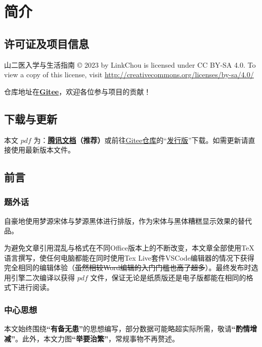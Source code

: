 \chapter[简介]{简介}

\section[许可证及项目信息]{许可证及项目信息}
山二医入学与生活指南 © 2023 by LinkChou is licensed under CC BY-SA 4.0. To view a copy of this license, visit \uline{\href{http://creativecommons.org/licenses/by-sa/4.0/}{http://creativecommons.org/licenses/by-sa/4.0/}}

仓库地址在\textbf{\uline{\href{https://gitee.com/mikazo/guide_for_freshman}{Gitee}}}，欢迎各位参与项目的贡献！

\section[\textcolor{red}{下载与更新}]{下载与更新}
本文 $pdf$ \textbf{}为：\textbf{\uline{\textcolor{red}{\href{https://docs.qq.com/s/ETcQ-ZFSrSsh6MK9bm773q}{腾讯文档}}}（推荐）}或前往\uline{\href{https://gitee.com/mikazo/guide_for_freshman}{Gitee仓库}}的“\uline{\href{https://gitee.com/mikazo/latex_version/releases/latest}{发行版}}”下载。如需更新请直接使用最新版本文件。

\section[前言]{前言}
\subsection[题外话]{题外话}
自豪地使用梦源宋体与梦源黑体进行排版，作为宋体与黑体糟糕显示效果的替代品。

为避免文章引用混乱与格式在不同Office版本上的不断改变，本文章全部使用\TeX 语言撰写，使任何电脑都能在同时使用Tex Live套件VSCode编辑器\footnotemark 的情况下获得完全相同的编辑体验（\sout{虽然相较Word编辑的入门门槛也高了超多}）。最终发布时选用\XeLaTeX 引擎二次编译以获得 $pdf$ 文件，保证无论是纸质版还是电子版都能在相同的格式下进行阅读。

\subsection[中心思想]{中心思想}
本文始终围绕\textbf{“有备无患”}的思想编写，部分数据可能略超实际所需，敬请\textbf{“酌情增减”}。此外，本文力图\textbf{“举要治繁”}，常规事物不再赘述。


